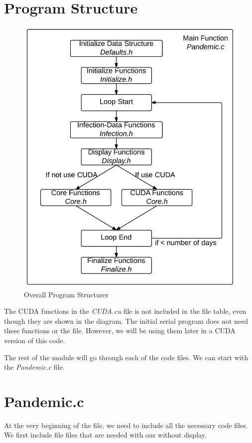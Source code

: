 \documentclass[letterpaper,10pt,openany,oneside]{sphinxmanual}
\begin{document}
\section{Program Structure}
\label{1-ProgramStructure/programstructure:id1}\begin{figure}[htbp]
\centering
\capstart

\includegraphics{Structure.png}
\caption{Overall Program Structurer}\end{figure}

The CUDA functions in the \emph{CUDA.cu} file is not included in the file table, even though they are shown in the diagram. The initial serial program does not need these functions or the file. However, we will be using them later in a CUDA version of this code.

The rest of the module will go through each of the code files. We can start with the \emph{Pandemic.c} file.


\section{Pandemic.c}
\label{1-ProgramStructure/programstructure:pandemic-c}
At the very beginning of the file, we need to include all the necessary code files. We first include file files that are needed with our without display.
\end{document}
